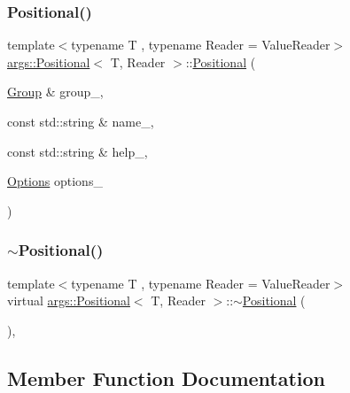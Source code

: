 \subsubsection{\texorpdfstring{Positional()}{Positional()}\hspace{0.1cm}{\footnotesize\ttfamily [2/2]}}
{\footnotesize\ttfamily template$<$typename T , typename Reader  = Value\+Reader$>$ \\
\hyperlink{classargs_1_1_positional}{args\+::\+Positional}$<$ T, Reader $>$\+::\hyperlink{classargs_1_1_positional}{Positional} (\begin{DoxyParamCaption}\item[{\hyperlink{classargs_1_1_group}{Group} \&}]{group\+\_\+,  }\item[{const std\+::string \&}]{name\+\_\+,  }\item[{const std\+::string \&}]{help\+\_\+,  }\item[{\hyperlink{namespaceargs_aa530c0f95194aa275f49a5f299ac9e77}{Options}}]{options\+\_\+ }\end{DoxyParamCaption})\hspace{0.3cm}{\ttfamily [inline]}}

\mbox{\label{classargs_1_1_positional_a7bf17b3ebdd71316d365df1b225d01d5}} 
\subsubsection{\texorpdfstring{$\sim$\+Positional()}{~Positional()}}
{\footnotesize\ttfamily template$<$typename T , typename Reader  = Value\+Reader$>$ \\
virtual \hyperlink{classargs_1_1_positional}{args\+::\+Positional}$<$ T, Reader $>$\+::$\sim$\hyperlink{classargs_1_1_positional}{Positional} (\begin{DoxyParamCaption}{ }\end{DoxyParamCaption})\hspace{0.3cm}{\ttfamily [inline]}, {\ttfamily [virtual]}}



\subsection{Member Function Documentation}
\mbox{\label{classargs_1_1_positional_ad96c622414ac070fe2ac95363ee1810a}} 
